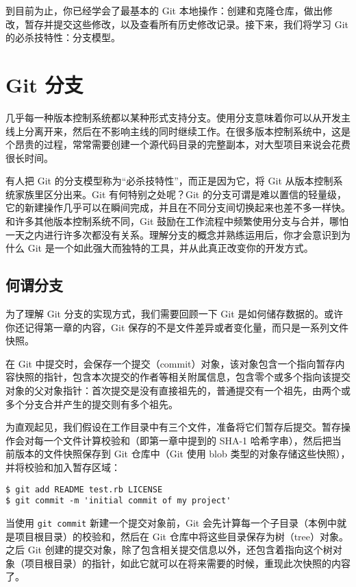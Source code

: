 \documentclass[a4paper]{book}
\newcommand{\chap}[1]{\newpage\thispagestyle{empty}\chapter{#1}\label{chap:\thechapter}}
\begin{document}
到目前为止，你已经学会了最基本的 Git 本地操作：创建和克隆仓库，做出修改，暂存并提交这些修改，以及查看所有历史修改记录。接下来，我们将学习 Git 的必杀技特性：分支模型。

\chap{Git 分支}

几乎每一种版本控制系统都以某种形式支持分支。使用分支意味着你可以从开发主线上分离开来，然后在不影响主线的同时继续工作。在很多版本控制系统中，这是个昂贵的过程，常常需要创建一个源代码目录的完整副本，对大型项目来说会花费很长时间。

有人把 Git 的分支模型称为“必杀技特性”，而正是因为它，将 Git 从版本控制系统家族里区分出来。Git 有何特别之处呢？Git 的分支可谓是难以置信的轻量级，它的新建操作几乎可以在瞬间完成，并且在不同分支间切换起来也差不多一样快。和许多其他版本控制系统不同，Git 鼓励在工作流程中频繁使用分支与合并，哪怕一天之内进行许多次都没有关系。理解分支的概念并熟练运用后，你才会意识到为什么 Git 是一个如此强大而独特的工具，并从此真正改变你的开发方式。

\section{何谓分支}

为了理解 Git 分支的实现方式，我们需要回顾一下 Git 是如何储存数据的。或许你还记得第一章的内容，Git 保存的不是文件差异或者变化量，而只是一系列文件快照。

在 Git 中提交时，会保存一个提交（commit）对象，该对象包含一个指向暂存内容快照的指针，包含本次提交的作者等相关附属信息，包含零个或多个指向该提交对象的父对象指针：首次提交是没有直接祖先的，普通提交有一个祖先，由两个或多个分支合并产生的提交则有多个祖先。

为直观起见，我们假设在工作目录中有三个文件，准备将它们暂存后提交。暂存操作会对每一个文件计算校验和（即第一章中提到的 SHA-1 哈希字串），然后把当前版本的文件快照保存到 Git 仓库中（Git 使用 blob 类型的对象存储这些快照），并将校验和加入暂存区域：

\begin{shaded}\begin{verbatim}
$ git add README test.rb LICENSE
$ git commit -m 'initial commit of my project'
\end{verbatim}\end{shaded}

当使用 \texttt{git commit} 新建一个提交对象前，Git 会先计算每一个子目录（本例中就是项目根目录）的校验和，然后在 Git 仓库中将这些目录保存为树（tree）对象。之后 Git 创建的提交对象，除了包含相关提交信息以外，还包含着指向这个树对象（项目根目录）的指针，如此它就可以在将来需要的时候，重现此次快照的内容了。
\end{document}
